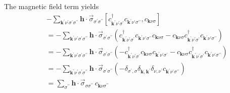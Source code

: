 The magnetic field term yields
\begin{eqnarray}
& & -\sum_{\mathbf{k}^{\prime}\nu^{\prime}\sigma^{\prime}
\sigma^{\prime\prime}}
\mathbf{h}\cdot \vec{\sigma}_{\sigma^{\prime}\sigma^{\prime\prime}}
\left[ c^{\dagger}_{\mathbf{k}^{\prime}\nu^{\prime}\sigma^{\prime}}
       c_{\mathbf{k}^{\prime}\nu^{\prime}\sigma^{\prime\prime}},
       c_{\mathbf{k}\nu\sigma} \right] \\
& &= -\sum_{\mathbf{k}^{\prime}\nu^{\prime}\sigma^{\prime}
\sigma^{\prime\prime}}
\mathbf{h}\cdot \vec{\sigma}_{\sigma^{\prime}\sigma^{\prime\prime}}
\left( c^{\dagger}_{\mathbf{k}^{\prime}\nu^{\prime}\sigma^{\prime}}
       c_{\mathbf{k}^{\prime}\nu^{\prime}\sigma^{\prime\prime}}
       c_{\mathbf{k}\nu\sigma} -
       c_{\mathbf{k}\nu\sigma}
 c^{\dagger}_{\mathbf{k}^{\prime}\nu^{\prime}\sigma^{\prime}}
       c_{\mathbf{k}^{\prime}\nu^{\prime}\sigma^{\prime\prime}}\right) \\
& &= -\sum_{\mathbf{k}^{\prime}\nu^{\prime}\sigma^{\prime}
\sigma^{\prime\prime}}
\mathbf{h}\cdot \vec{\sigma}_{\sigma^{\prime}\sigma^{\prime\prime}}
\left(- c^{\dagger}_{\mathbf{k}^{\prime}\nu^{\prime}\sigma^{\prime}} 
 c_{\mathbf{k}\nu\sigma} 
c_{\mathbf{k}^{\prime}\nu^{\prime}\sigma^{\prime}} -
 c_{\mathbf{k}\nu\sigma}
 c^{\dagger}_{\mathbf{k}^{\prime}\nu^{\prime}\sigma^{\prime}}
       c_{\mathbf{k}^{\prime}\nu^{\prime}\sigma^{\prime\prime}}\right) \\
& & = -\sum_{\mathbf{k}^{\prime}\nu^{\prime}\sigma^{\prime}
\sigma^{\prime\prime}}
\mathbf{h}\cdot \vec{\sigma}_{\sigma^{\prime}\sigma^{\prime\prime}}
\left( -\delta_{\sigma^{\prime},\sigma} 
\delta_{\mathbf{k},\mathbf{k}^{\prime}}\delta_{\nu,\nu^{\prime}}
c_{\mathbf{k}^{\prime}\nu^{\prime}\sigma^{\prime\prime}} \right) \\
& & = \sum_{\sigma^{\prime\prime}}\mathbf{h}\cdot
\vec{\sigma}_{\sigma\sigma^{\prime\prime}}\,c_{\mathbf{k}\nu\sigma^{\prime\prime}}
\end{eqnarray}

